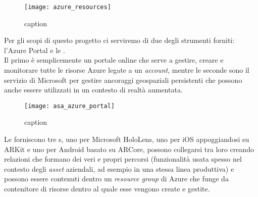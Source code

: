 \begin{figure}[H]
  \centering
  \texttt{[image: azure\_resources]}
  \caption[Azure Portal creazione risorse]{caption \todo}
\end{figure}

Per gli scopi di questo progetto ci serviremo di due degli strumenti forniti: l'Azure Portal e le \asa{}.\\
Il primo è semplicemente un portale online che serve a gestire, creare e monitorare tutte le risorse Azure legate a un \textit{account}, mentre le seconde sono il servizio di Microsoft per gestire ancoraggi geospaziali persistenti che possono anche essere utilizzati in un contesto di realtà aumentata.

\begin{figure}[H]
  \centering
  \texttt{[image: asa\_azure\_portal]}
  \caption[Azure Portal]{caption \todo}
\end{figure}

Le \asa{} forniscono tre \sdk{}s, uno per Microsoft HoloLens, uno per iOS appoggiandosi su ARKit e uno per Android basato su ARCore, possono collegarsi tra loro creando relazioni che formano dei veri e propri percorsi (funzionalità usata spesso nel contesto degli \textit{asset} aziendali, ad esempio in una stessa linea produttiva) e possono essere contenuti dentro un \textit{resource group} di Azure che funge da contenitore di risorse dentro al quale esse vengono create e gestite.

